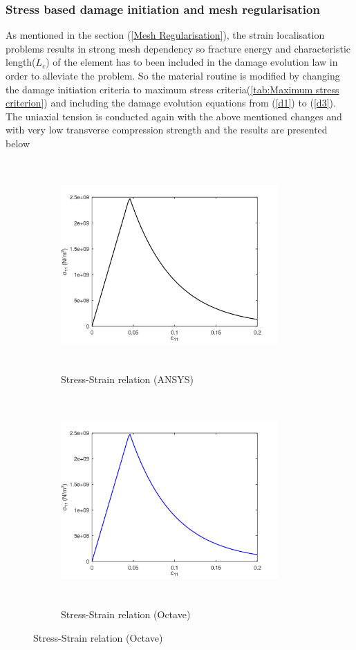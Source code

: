 \documentclass[a4paper,12pt,twoside]{report}
\begin{document}
\subsubsection{Stress based damage initiation and mesh regularisation}
\indent\indent\indent  As mentioned in the section (\ref{Mesh Regularisation}), the strain localisation problems results in strong mesh dependency so fracture energy and characteristic length($L_{c}$) of the element has to been included in the damage evolution law in order to alleviate the problem. So the material routine is modified by changing the damage initiation criteria to maximum stress criteria(\ref{tab:Maximum stress criterion}) and including the damage evolution equations from (\ref{d1}) to (\ref{d3}). The uniaxial tension is conducted again with the above mentioned changes and with very low transverse compression strength and the results are presented below
\begin{figure}[htbp!]
     \captionsetup[subfigure]{justification=centering}
     \begin{subfigure}{0.4\textwidth}
         \includegraphics[width=8.3cm,height=8cm,keepaspectratio]{22.StressvsStrain_Ansys.png}
         \caption{Stress-Strain relation (ANSYS)}
         \label{fig:Stress-Strain relation in Ansys2}
     \end{subfigure}
     \hspace{1.8cm}
     \begin{subfigure}{0.4\textwidth}
          \includegraphics[width=8.3cm,height=8cm,keepaspectratio]{22.StressvsStrain_Octave.png}
         \caption{Stress-Strain relation (Octave)}
         \label{fig:Stress-Strain relation Octave2}
     \end{subfigure}
\end{figure}
\end{document}
